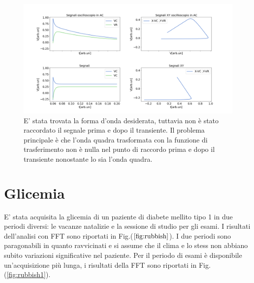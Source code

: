 \documentclass{article}
\begin{document}
    \begin{figure}[H]
        \centering
        \includegraphics[width=\textwidth]{FFT13/pinnacolone.png}
        \caption{E' stata trovata la forma d'onda desiderata, tuttavia non è stato raccordato il segnale prima 
            e dopo il transiente. Il problema principale è che l'onda quadra trasformata con la funzione di 
            trasferimento non è nulla nel punto di raccordo prima e dopo il transiente
            nonostante lo sia l'onda quadra.}
        \label{fig:pinnacolone}
    \end{figure} 


\section{Glicemia}

        E' stata acquisita la glicemia di un paziente di diabete mellito tipo 1 in 
        due periodi diversi: le vacanze natalizie e la sessione di studio per gli esami.
        I risultati dell'analisi con FFT sono riportati in Fig.($\ref{fig:rubbish}$).
        I due periodi sono paragonabili in quanto ravvicinati e si assume che
        il clima e lo stess non abbiano subito variazioni significative 
        nel paziente.
        Per il periodo di esami  è disponibile un'acquisizione più lunga, i risultati
        della FFT sono  riportati in Fig.(\ref{fig:rubbish1}).
        
\end{document}
